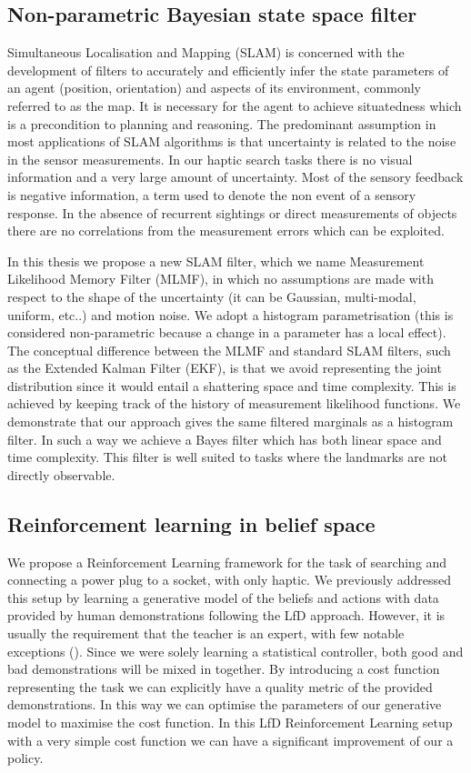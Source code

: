 \subsection{Non-parametric Bayesian state space filter}

Simultaneous Localisation and Mapping (SLAM) is concerned with the development of filters to accurately and efficiently infer 
the state parameters of an agent (position, orientation) and aspects of its environment, commonly referred to as the map. 
It is necessary for the agent to achieve situatedness which is a precondition to planning and reasoning. The 
predominant assumption in most applications of SLAM algorithms is that uncertainty is related to the noise in the sensor measurements. In 
our haptic search tasks there is no visual information and a very large amount of uncertainty. Most of the sensory
feedback is negative information, a term used to denote the non event of a sensory response.
In the absence of recurrent sightings or direct measurements of objects there are no correlations from the measurement errors 
which can be exploited. 

In this thesis we propose a new SLAM filter, which we name Measurement Likelihood Memory Filter (MLMF), in 
which no assumptions are made with respect to the shape of the uncertainty (it can be Gaussian, multi-modal, uniform, etc..) and 
motion noise. We adopt a histogram parametrisation (this is considered non-parametric because a change in a parameter has a local effect). 
The conceptual difference between the MLMF and standard SLAM filters, 
such as the Extended Kalman Filter (EKF), is that we avoid representing the joint distribution since it would entail a shattering space and time complexity. 
This is achieved by keeping track of the history of measurement likelihood functions. We demonstrate that our approach gives 
the same filtered marginals as a histogram filter. In such a way we achieve a Bayes filter which has both linear space and 
time complexity. This filter is well suited to tasks where the landmarks are not directly observable.

\subsection{Reinforcement learning in belief space}

We propose a Reinforcement Learning framework for the task of searching and connecting a power plug to a socket, with only haptic. 
We previously addressed this setup by learning a generative model of the beliefs and actions with data 
provided by human demonstrations following the LfD approach. However, it is usually the requirement that 
the teacher is an expert, with few notable exceptions (\cite{rai2013learning}). Since we were solely learning a 
statistical controller, both good and bad demonstrations will be mixed in together. By introducing a cost function 
representing the task we can explicitly have a quality metric of the provided demonstrations. In this way 
we can optimise the parameters of our generative model to maximise the cost function. In this LfD Reinforcement 
Learning setup with a very simple cost function we can have a significant improvement of our a policy.

